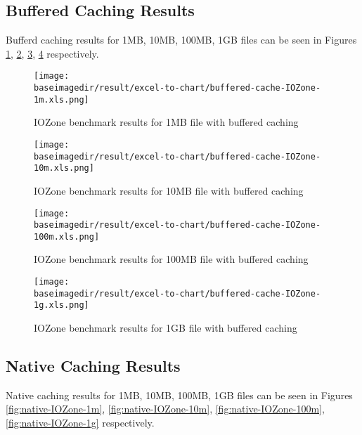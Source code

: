 \documentclass{article}
\newcommand{\baseimagedir}{..}
\begin{document}
\subsection{Buffered Caching Results}
Bufferd caching results for 1MB, 10MB, 100MB, 1GB files can be seen in Figures \ref{fig:buffered-IOZone-1m}, \ref{fig:buffered-IOZone-10m}, \ref{fig:buffered-IOZone-100m}, \ref{fig:buffered-IOZone-1g} respectively.

\begin{figure}
    \centering
    \texttt{[image: \\baseimagedir/result/excel-to-chart/buffered-cache-IOZone-1m.xls.png]}
    \caption{IOZone benchmark results for 1MB file with buffered caching}
    \label{fig:buffered-IOZone-1m}
\end{figure}

\begin{figure}
    \centering
    \texttt{[image: \\baseimagedir/result/excel-to-chart/buffered-cache-IOZone-10m.xls.png]}
    \caption{IOZone benchmark results for 10MB file with buffered caching}
    \label{fig:buffered-IOZone-10m}
\end{figure}

\begin{figure}
    \centering
    \texttt{[image: \\baseimagedir/result/excel-to-chart/buffered-cache-IOZone-100m.xls.png]}
    \caption{IOZone benchmark results for 100MB file with buffered caching}
    \label{fig:buffered-IOZone-100m}
\end{figure}

\begin{figure}
    \centering
    \texttt{[image: \\baseimagedir/result/excel-to-chart/buffered-cache-IOZone-1g.xls.png]}
    \caption{IOZone benchmark results for 1GB file with buffered caching}
    \label{fig:buffered-IOZone-1g}
\end{figure}


\subsection{Native Caching Results}
Native caching results for 1MB, 10MB, 100MB, 1GB files can be seen in Figures \ref{fig:native-IOZone-1m}, \ref{fig:native-IOZone-10m}, \ref{fig:native-IOZone-100m}, \ref{fig:native-IOZone-1g} respectively.
\end{document}
